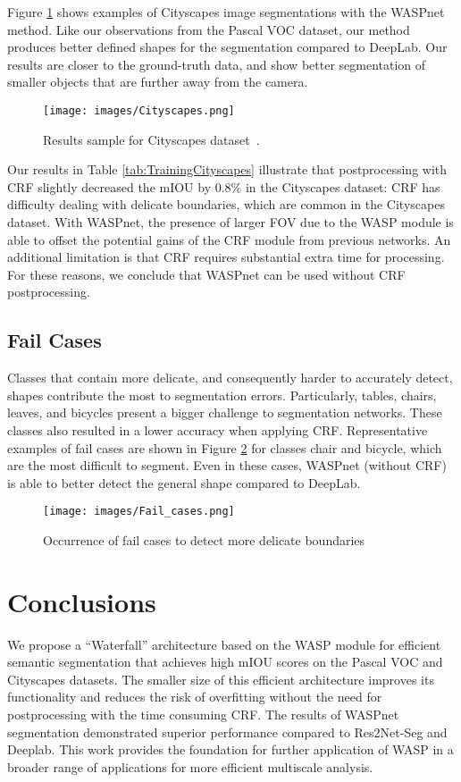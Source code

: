 \documentclass[sensors,article,accept,moreauthors,pdftex]{Definitions/mdpi}
\begin{document}
Figure \ref{fig:cityscapes} shows examples of Cityscapes image segmentations with the WASPnet method. Like our observations from the Pascal VOC dataset, our method produces better defined shapes for the segmentation compared to DeepLab.
Our results are closer to the ground-truth data, and show better segmentation of smaller objects that are further away from the camera.


\begin{figure}[H]
\centering
\texttt{[image: images/Cityscapes.png]}
\caption{Results sample for Cityscapes dataset~\cite{Cityscapes}.}
\label{fig:cityscapes}
\end{figure}



Our results in Table \ref{tab:TrainingCityscapes} illustrate that  postprocessing with CRF slightly decreased the mIOU by 0.8\% in the Cityscapes dataset: CRF has difficulty dealing with delicate boundaries, which are common in the Cityscapes dataset.
With WASPnet, the presence of larger FOV due to the WASP module is able to offset the potential gains of the CRF module from previous networks.
An additional limitation is that CRF requires substantial extra time for processing.  For these reasons, we conclude that WASPnet can be used without CRF postprocessing.

\subsection*{Fail Cases}

Classes that contain more delicate, and consequently harder to accurately detect, shapes contribute the most to segmentation errors. Particularly, tables, chairs, leaves, and bicycles present a bigger challenge to segmentation networks.
These classes also resulted in a lower accuracy when applying CRF.
Representative examples of fail cases are shown in Figure \ref{fig:Fail} for classes chair and bicycle, which are the most difficult to segment. Even in these cases, WASPnet (without CRF) is able to better detect the general shape compared to DeepLab.


\begin{figure}[H]
\centering
\texttt{[image: images/Fail\_cases.png]}
\caption{Occurrence of fail cases to detect more delicate boundaries}
\label{fig:Fail}
\end{figure}


\section{Conclusions}
We propose a ``Waterfall'' architecture based on the WASP module for efficient semantic segmentation that achieves high mIOU scores on the Pascal VOC and Cityscapes datasets. The smaller size of this efficient architecture improves its functionality and reduces the risk of overfitting without the need for postprocessing with the time consuming CRF.
The results of WASPnet segmentation demonstrated superior performance compared to Res2Net-Seg and Deeplab.
This work provides the foundation for further application of WASP in a broader range of applications for more efficient multiscale analysis.
\end{document}
